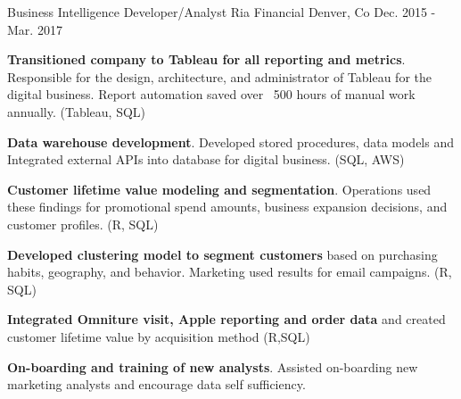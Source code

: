 \begin{cventries}
  \cventry
    {Business Intelligence Developer/Analyst} %
    {Ria Financial} %
    {Denver, Co} %
    {Dec. 2015 - Mar. 2017} %
    {
      \begin{cvitems} %
        \item {\textbf{Transitioned company to Tableau for all reporting and metrics}. Responsible for the design, architecture, and administrator of Tableau for the digital business. Report automation saved over ~500 hours of manual work annually. (Tableau, SQL)}
        \item {\textbf{Data warehouse development}. Developed stored procedures, data models and Integrated external APIs into database for digital business. (SQL, AWS)}
        \item {\textbf{Customer lifetime value modeling and segmentation}. Operations used these findings for promotional spend amounts, business expansion decisions, and customer profiles. (R, SQL)}
        \item {\textbf{Developed clustering model to segment customers} based on purchasing habits, geography, and behavior. Marketing used results for email campaigns. (R, SQL)}
        \item {\textbf{Integrated Omniture visit, Apple reporting and order data} and created customer lifetime value by acquisition method (R,SQL)}
        \item {\textbf{On-boarding and training of new analysts}. Assisted on-boarding new marketing analysts and encourage data self sufficiency.}        
      \end{cvitems}
    }


\end{cventries}
